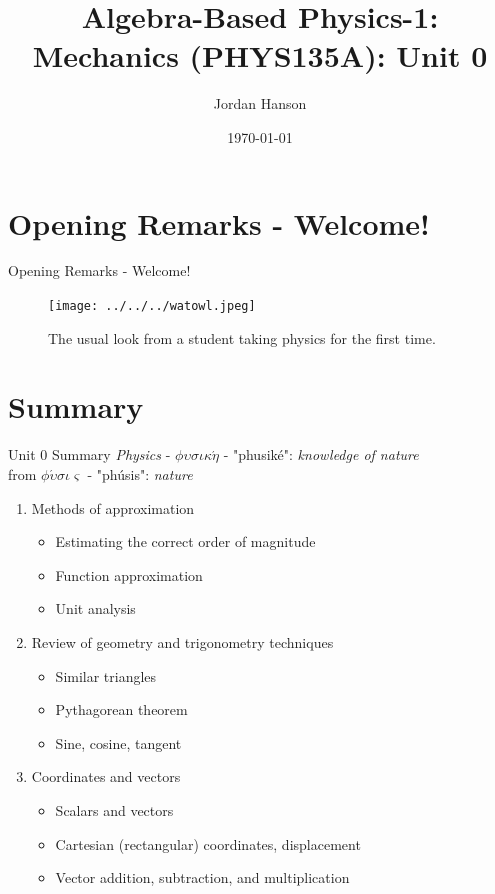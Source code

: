 \documentclass{beamer}
\title{Algebra-Based Physics-1: Mechanics (PHYS135A): Unit 0}
\date{\today}
\author{Jordan Hanson}
\institute{Whittier College Department of Physics and Astronomy}
\begin{document}
\maketitle

\section{Opening Remarks - Welcome!}

\begin{frame}{Opening Remarks - Welcome!}
\small
\begin{figure}
\centering
\texttt{[image: ../../../watowl.jpeg]}
\caption{\label{fig:wat1} The usual look from a student taking physics for the first time.}
\end{figure}
\end{frame}

\section{Summary}

\begin{frame}{Unit 0 Summary}
\textit{Physics} - $\phi\upsilon\sigma\iota\kappa\acute{\eta}$ - "phusik\'e": \textit{knowledge of nature} \\
from $\phi\acute{\upsilon}\sigma\iota\varsigma$ - "ph\'usis": \textit{nature}
\begin{enumerate}
\item Methods of approximation
\begin{itemize}
\item \alert{Estimating} the correct order of magnitude
\item \alert{Function} approximation
\item \alert{Unit analysis}
\end{itemize}
\item Review of geometry and trigonometry techniques
\begin{itemize}
\item Similar triangles
\item Pythagorean theorem
\item Sine, cosine, tangent
\end{itemize}
\item Coordinates and vectors
\begin{itemize}
\item \alert{Scalars} and \alert{vectors}
\item \alert{Cartesian} (rectangular) coordinates, displacement
\item \alert{Vector} addition, subtraction, and multiplication
\end{itemize}
\end{enumerate}
\end{frame}
\end{document}
